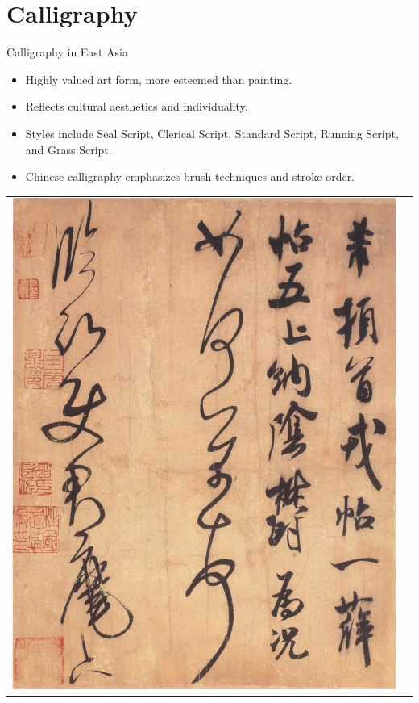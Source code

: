 \documentclass[xetex]{beamer}
\begin{document}
\section{Calligraphy}
\begin{frame}{Calligraphy in East Asia}
\begin{itemize}
    \item Highly valued art form, more esteemed than painting.
    \item Reflects cultural aesthetics and individuality.
    \item Styles include Seal Script, Clerical Script, Standard Script, Running Script, and Grass Script.
    \item Chinese calligraphy emphasizes brush techniques and stroke order.
\end{itemize}
\begin{center}
    \begin{tabular}{cc}
      \includegraphics[height=0.5\textheight]{pics/This_Letter_written_by_Mi_Fei.jpg} &

\end{tabular}
\end{center}
\end{frame}
\end{document}
